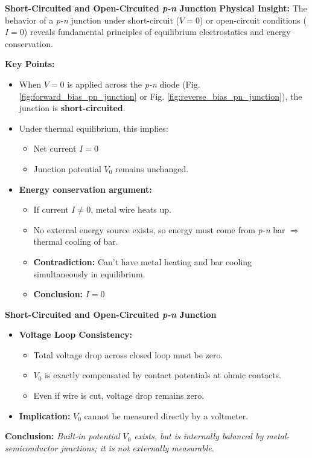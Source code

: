 \begin{frame}{\textbf{Short-Circuited and Open-Circuited \textit{p-n} Junction}}
    \textbf{Physical Insight:} The behavior of a \textit{p-n} junction under short-circuit ($V = 0$) or open-circuit conditions ($I = 0$) reveals fundamental principles of equilibrium electrostatics and energy conservation.

    \vspace{0.7em}
    \textbf{Key Points:}
    \begin{itemize}
        \item When $V = 0$ is applied across the \textit{p-n} diode (Fig. \ref{fig:forward_bias_pn_junction} or Fig. \ref{fig:reverse_bias_pn_junction}), the junction is \textbf{short-circuited}.
        \item Under thermal equilibrium, this implies:
        \begin{itemize}
            \item Net current $I = 0$
            \item Junction potential $V_0$ remains unchanged.
        \end{itemize}

        \item \textbf{Energy conservation argument:}
        \begin{itemize}
            \item If current $I \neq 0$, metal wire heats up.
            \item No external energy source exists, so energy must come from \textit{p-n} bar $\Rightarrow$ thermal cooling of bar.
            \item \textbf{Contradiction:} Can't have metal heating and bar cooling simultaneously in equilibrium.
            \item \textbf{Conclusion:} $I = 0$
        \end{itemize}
	\end{itemize}
\end{frame}

\begin{frame}{\textbf{Short-Circuited and Open-Circuited \textit{p-n} Junction}}
	\begin{itemize}
	\item \textbf{Voltage Loop Consistency:}
	\begin{itemize}
		\item Total voltage drop across closed loop must be zero.
		\item $V_0$ is exactly compensated by contact potentials at ohmic contacts.
		\item Even if wire is cut, voltage drop remains zero.
	\end{itemize}

	\item \textbf{Implication:} $V_0$ cannot be measured directly by a voltmeter.
	\end{itemize}

	\vspace{0.7em}
	\textbf{Conclusion:} \textit{Built-in potential $V_0$ exists, but is internally balanced by metal-semiconductor junctions; it is not externally measurable.}
\end{frame}


